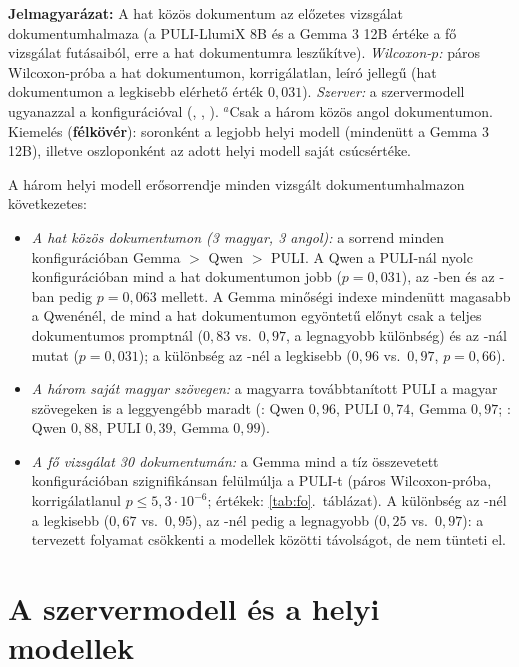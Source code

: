 \begin{table}[htbp]
\smallskip
\parbox{\textwidth}{\footnotesize\textbf{Jelmagyarázat:} A hat közös dokumentum az előzetes vizsgálat dokumentumhalmaza (a PULI-LlumiX 8B és a Gemma 3 12B értéke a fő vizsgálat futásaiból, erre a hat dokumentumra leszűkítve). \emph{Wilcoxon-$p$:} páros Wilcoxon-próba a hat dokumentumon, korrigálatlan, leíró jellegű (hat dokumentumon a legkisebb elérhető érték $0{,}031$). \emph{Szerver:} a szervermodell ugyanazzal a konfigurációval (, , ). $^a$Csak a három közös angol dokumentumon. Kiemelés (\colorbox[HTML]{E6F4EA}{\textbf{félkövér}}): soronként a legjobb helyi modell (mindenütt a Gemma 3 12B), illetve oszloponként az adott helyi modell saját csúcsértéke.}
\end{table}

A három helyi modell erősorrendje minden vizsgált dokumentumhalmazon következetes:
\begin{itemize}[leftmargin=*,itemsep=2pt,topsep=2pt]
\item \emph{A hat közös dokumentumon (3 magyar, 3 angol):} a sorrend minden konfigurációban Gemma $>$ Qwen $>$ PULI. A Qwen a PULI-nál nyolc konfigurációban mind a hat dokumentumon jobb ($p=0{,}031$), az -ben és az -ban pedig $p=0{,}063$ mellett. A Gemma minőségi indexe mindenütt magasabb a Qwenénél, de mind a hat dokumentumon egyöntetű előnyt csak a teljes dokumentumos promptnál ($0{,}83$ vs.\ $0{,}97$, a legnagyobb különbség) és az -nál mutat ($p=0{,}031$); a különbség az -nél a legkisebb ($0{,}96$ vs.\ $0{,}97$, $p=0{,}66$).
\item \emph{A három saját magyar szövegen:} a magyarra továbbtanított PULI a magyar szövegeken is a leggyengébb maradt (: Qwen $0{,}96$, PULI $0{,}74$, Gemma $0{,}97$; : Qwen $0{,}88$, PULI $0{,}39$, Gemma $0{,}99$).
\item \emph{A fő vizsgálat 30 dokumentumán:} a Gemma mind a tíz összevetett konfigurációban szignifikánsan felülmúlja a PULI-t (páros Wilcoxon-próba, korrigálatlanul $p\le5{,}3\cdot10^{-6}$; értékek: \ref{tab:fo}.~táblázat). A különbség az -nél a legkisebb ($0{,}67$ vs.\ $0{,}95$), az -nél pedig a legnagyobb ($0{,}25$ vs.\ $0{,}97$): a tervezett folyamat csökkenti a modellek közötti távolságot, de nem tünteti el.
\end{itemize}

\section{A szervermodell és a helyi modellek}
\label{sec:modellek-szerver}


